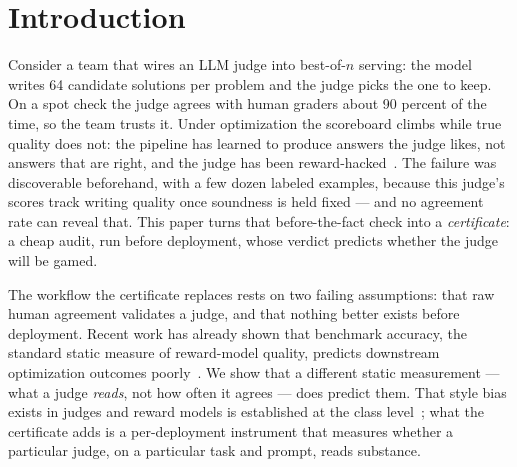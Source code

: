 \section{Introduction}
\label{sec:intro}

Consider a team that wires an LLM judge into best-of-$n$ serving: the model writes 64 candidate solutions per problem and the judge picks the one to keep.
On a spot check the judge agrees with human graders about 90 percent of the time, so the team trusts it.
Under optimization the scoreboard climbs while true quality does not: the pipeline has learned to produce answers the judge likes, not answers that are right, and the judge has been reward-hacked~\cite{gao2022scaling,skalse2022defining}.
The failure was discoverable beforehand, with a few dozen labeled examples, because this judge's scores track writing quality once soundness is held fixed --- and no agreement rate can reveal that.
This paper turns that before-the-fact check into a \emph{certificate}: a cheap audit, run before deployment, whose verdict predicts whether the judge will be gamed.

The workflow the certificate replaces rests on two failing assumptions: that raw human agreement validates a judge, and that nothing better exists before deployment.
Recent work has already shown that benchmark accuracy, the standard static measure of reward-model quality, predicts downstream optimization outcomes poorly~\cite{wen2024rethinking}.
We show that a different static measurement --- what a judge \emph{reads}, not how often it agrees --- does predict them.
That style bias exists in judges and reward models is established at the class level~\cite{wu2023style,rmbench2024}; what the certificate adds is a per-deployment instrument that measures whether a particular judge, on a particular task and prompt, reads substance.


